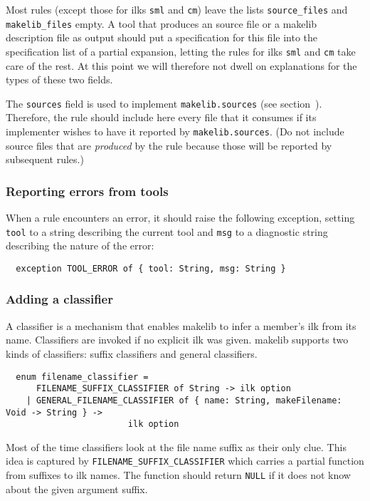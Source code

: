 Most rules (except those for ilks {\tt sml} and {\tt cm}) leave the
lists {\tt source_files} and {\tt makelib_files} empty.  A tool that produces an
source file or a makelib description file as output should put a
specification for this file into the specification list of a partial
expansion, letting the rules for ilks {\tt sml} and {\tt cm} take
care of the rest.  At this point we will therefore not dwell on
explanations for the types of these two fields.

The {\tt sources} field is used to implement {\tt makelib.sources} (see
section~).  Therefore, the rule should
include here every file that it consumes if its implementer wishes to
have it reported by {\tt makelib.sources}.  (Do not include source files
that are {\em produced} by the rule because those will be reported by
subsequent rules.)

\subsubsection{Reporting errors from tools}

When a rule encounters an error, it should raise the following
exception, setting {\tt tool} to a string describing the current tool
and {\tt msg} to a diagnostic string describing the nature of the
error:

\begin{verbatim}
  exception TOOL_ERROR of { tool: String, msg: String }
\end{verbatim}

\subsubsection{Adding a classifier}

A classifier is a mechanism that enables makelib to infer a member's ilk
from its name.  Classifiers are invoked if no explicit ilk was
given.  makelib supports two kinds of classifiers: suffix classifiers and
general classifiers.

\begin{verbatim}
  enum filename_classifier =
      FILENAME_SUFFIX_CLASSIFIER of String -> ilk option
    | GENERAL_FILENAME_CLASSIFIER of { name: String, makeFilename: Void -> String } ->
                        ilk option
\end{verbatim}

Most of the time classifiers look at the file name suffix as their only
clue.  This idea is captured by {\tt FILENAME\_SUFFIX\_CLASSIFIER} which carries a
partial function from suffixes to ilk names.  The function should
return {\tt NULL} if it does not know about the given argument suffix.

